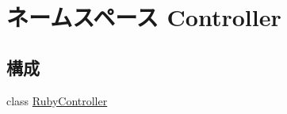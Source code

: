 \hypertarget{namespaceController}{
\section{ネームスペース Controller}
\label{namespaceController}
}
\subsection*{構成}
\begin{DoxyCompactItemize}
\item 
class \hyperlink{classController_1_1RubyController}{RubyController}
\end{DoxyCompactItemize}
